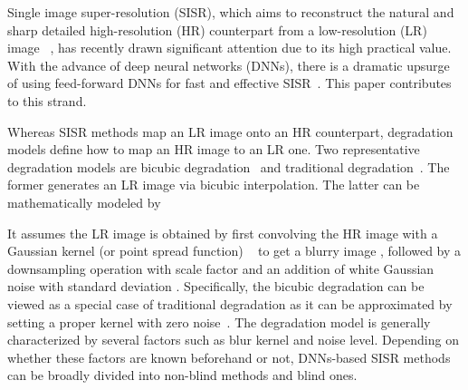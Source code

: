 \documentclass[10pt,twocolumn,letterpaper]{article}
\begin{document}
Single image super-resolution (SISR), which aims to reconstruct the natural and sharp detailed high-resolution (HR) counterpart  from a low-resolution (LR) image ~\cite{timofte2014a+,dong2014learning}, has recently drawn significant attention due to its high practical value. With the advance of deep neural networks (DNNs), there is a dramatic upsurge of using feed-forward DNNs for fast and effective SISR~\cite{zhang2018residual,lim2017enhanced,wang2018esrgan,lai2017deep,hui2019lightweight,liang2021hierarchical}. This paper contributes to this strand.


Whereas SISR methods map an LR image onto an HR counterpart, degradation models define how to map an HR image to an LR one. Two representative degradation models are bicubic degradation~\cite{timofte2017ntire} and traditional degradation~\cite{liu2013bayesian,shocher2018zero}.
The former generates an LR image via bicubic interpolation. The latter can be mathematically modeled by

It assumes the LR image is obtained by first convolving the HR image with a Gaussian kernel (or point spread function) ~\cite{efrat2013accurate} to get a blurry image , followed by a downsampling operation  with scale factor  and an addition of white Gaussian noise  with standard deviation .
Specifically, the bicubic degradation can be viewed as a special case of traditional degradation as it can be approximated by setting a proper kernel with zero noise~\cite{zhang2020deep,bell2019blind}. The degradation model is generally characterized by several factors such as blur kernel and noise level. Depending on whether these factors are known beforehand or not, DNNs-based SISR methods can be broadly divided into non-blind methods and blind ones.
\end{document}
